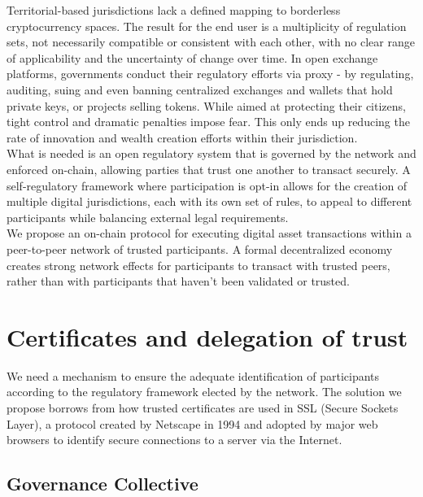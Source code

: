 \documentclass[10pt]{article}
\begin{document}
\noindent Territorial-based jurisdictions lack a defined mapping to borderless cryptocurrency spaces. The result for the end user is a multiplicity of regulation sets, not necessarily compatible or consistent with each other, with no clear range of applicability and the uncertainty of change over time. In open exchange platforms, governments conduct their regulatory efforts via proxy - by regulating, auditing, suing and even banning\cite{scmp} centralized exchanges and wallets that hold private keys\cite{coinbase}, or projects selling tokens\cite{zerox}. While aimed at protecting their citizens, tight control and dramatic penalties impose fear. This only ends up reducing the rate of innovation and wealth creation efforts within their jurisdiction.\\

\noindent What is needed is an open regulatory system that is governed by the network and enforced on-chain, allowing parties that trust one another to transact securely. A self-regulatory framework where participation is opt-in allows for the creation of multiple digital jurisdictions, each with its own set of rules, to appeal to different participants while balancing external legal requirements.   \\

\noindent We propose an on-chain protocol for executing digital asset transactions within a peer-to-peer network of trusted participants. A formal decentralized economy creates strong network effects for participants to transact with trusted peers, rather than with participants that haven’t been validated or trusted. \\

\section{Certificates and delegation of trust}

We need a mechanism to ensure the adequate identification of participants according to the regulatory framework elected by the network. The solution we propose borrows from how trusted certificates are used in SSL (Secure Sockets Layer)\cite{digicert}, a protocol created by Netscape in 1994 and adopted by major web browsers to identify secure connections to a server via the Internet\cite{evssl}. \\

\subsection{Governance Collective}
\end{document}
